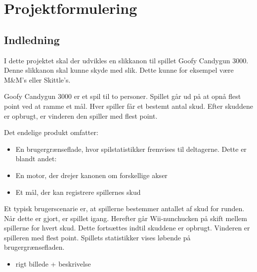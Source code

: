 \chapter{Projektformulering}
\section{Indledning}
I dette projektet skal der udvikles en slikkanon til spillet Goofy Candygun 3000. Denne slikkanon skal kunne skyde med slik. Dette kunne for eksempel være M\&M’s eller Skittle’s.

Goofy Candygun 3000 er et spil til to personer. Spillet går ud på at opnå flest point ved at ramme et mål. Hver spiller får et bestemt antal skud. Efter skuddene er opbrugt, er vinderen den spiller med flest point.


Det endelige produkt omfatter:
\begin{itemize}
	\item{En brugergrænseflade, hvor spilstatistikker fremvises til deltagerne. Dette er blandt andet:}
	\item{En motor, der drejer kanonen om forskellige akser}
	\item{Et mål, der kan registrere spillernes skud}
\end{itemize}

Et typisk brugerscenarie er, at spillerne bestemmer antallet af skud for runden. Når dette er gjort, er spillet igang. Herefter går Wii-nunchucken på skift mellem spillerne for hvert skud. Dette fortsættes indtil skuddene er opbrugt. Vinderen er spilleren med flest point. Spillets statistikker vises løbende på brugergrænsefladen. 

\begin{itemize}
	\item{rigt billede + beskrivelse}
\end{itemize}


